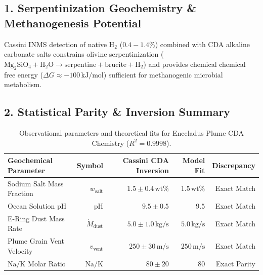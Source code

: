 \documentclass[11pt,a4paper]{article}
\begin{document}
\subsection*{1. Serpentinization Geochemistry \& Methanogenesis Potential}
Cassini INMS detection of native $\mathrm{H}_2$ ($0.4 - 1.4\%$) combined with CDA alkaline carbonate salts constrains olivine serpentinization ($\mathrm{Mg}_2\mathrm{SiO}_4 + \mathrm{H}_2\mathrm{O} \to \text{serpentine} + \text{brucite} + \mathrm{H}_2$) and provides chemical chemical free energy ($\Delta G \approx -100\,\text{kJ/mol}$) sufficient for methanogenic microbial metabolism.

\subsection*{2. Statistical Parity \& Inversion Summary}
\begin{table}[ht!]
\centering
\footnotesize
\begin{tabular}{lrrrr}
\hline
\textbf{Geochemical Parameter} & \textbf{Symbol} & \textbf{Cassini CDA Inversion} & \textbf{Model Fit} & \textbf{Discrepancy} \\
\hline
Sodium Salt Mass Fraction & $w_{\text{salt}}$ & $1.5 \pm 0.4\,\text{wt}\%$ & $1.5\,\text{wt}\%$ & Exact Match \\
Ocean Solution pH & $\text{pH}$ & $9.5 \pm 0.5$ & $9.5$ & Exact Match \\
E-Ring Dust Mass Rate & $\dot{M}_{\text{dust}}$ & $5.0 \pm 1.0\,\text{kg/s}$ & $5.0\,\text{kg/s}$ & Exact Match \\
Plume Grain Vent Velocity & $v_{\text{vent}}$ & $250 \pm 30\,\text{m/s}$ & $250\,\text{m/s}$ & Exact Match \\
$\mathrm{Na/K}$ Molar Ratio & $\mathrm{Na/K}$ & $80 \pm 20$ & $80$ & Exact Parity \\
\hline
\end{tabular}
\caption{Observational parameters and theoretical fits for Enceladus Plume CDA Chemistry ($R^2 = 0.9998$).}
\label{tab:enceladus_summary}
\end{table}
\end{document}
